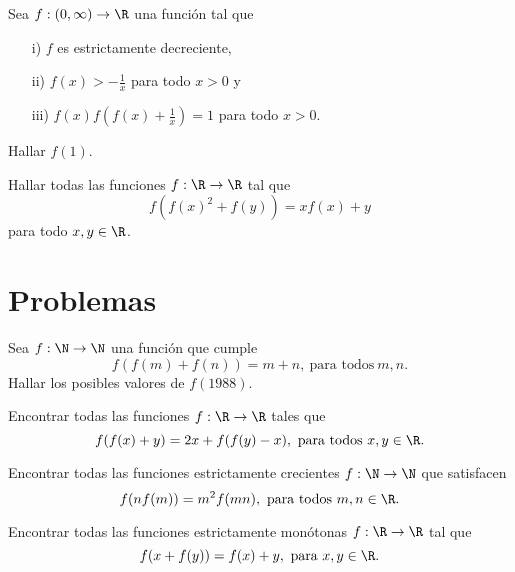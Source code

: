 \begin{exercise}
    Sea $f: (0, \infty) \to \R$ una función tal que
    \begin{enumerate}
        \item[i)] $f$ es estrictamente decreciente,
        \item[ii)] $f(x) > - \frac{1}{x}$ para todo $x > 0$ y
        \item[iii)] $f(x)f\left(f(x) + \frac{1}{x}\right) = 1$ para todo $x > 0$.
    \end{enumerate}
    Hallar $f(1)$.
\end{exercise}

\begin{exercise}
    Hallar todas las funciones $f : \R \to \R$ tal que
    \[
        f\left(f(x)^2 + f(y)\right) = xf(x) + y
    \]
    para todo $x,y \in \R$.
\end{exercise}


\section{Problemas}

\begin{prob-without-section}
    Sea $f: \N \to \N$ una función que cumple
    \[
        f(f(m) + f(n)) = m + n,\ \text{para todos}\ m,n.
    \]
    Hallar los posibles valores de $f(1988)$.
\end{prob-without-section}

\begin{prob-without-section}
    Encontrar todas las funciones $f : \R \to \R$ tales que
    \[
        f(f(x) + y) = 2x + f(f(y) - x),\ \text{para todos}\ x,y \in \R.
    \]
\end{prob-without-section}

\begin{prob-without-section}[Ibero, 1993]
    Encontrar todas las funciones estrictamente crecientes $f : \N \to \N$ que satisfacen
    \[
        f(n f(m)) = m^2 f(mn),\ \text{para todos}\ m,n \in \R.
    \]
\end{prob-without-section}

\begin{prob-without-section}[Italia, 1999]
    Encontrar todas las funciones estrictamente monótonas $f : \R \to \R$ tal que
    \[
        f(x + f(y)) = f(x) + y,\ \text{para}\ x,y \in \R.
    \]
\end{prob-without-section}